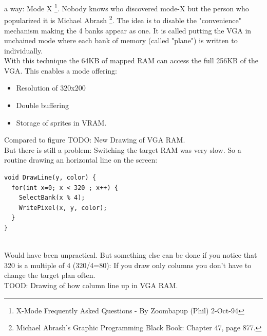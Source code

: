 a way: Mode X \footnote{X-Mode Frequently Asked Questions - By Zoombapup (Phil)  2-Oct-94}. Nobody knows who discovered mode-X but the person who popularized it is Michael Abrash \footnote{Michael Abrash's Graphic Programming Black Book: Chapter 47, page 877.}. The idea is to disable the "convenience" mechanism making the 4 banks appear as one. It is called putting the VGA in unchained mode where each bank of memory (called "plane") is written to individually.\\
With this technique the 64KB of mapped RAM can access the full 256KB of the VGA. This enables a mode offering:
\begin{itemize}
	\item Resolution of 320x200
	\item Double buffering
	\item Storage of sprites in VRAM.
\end{itemize}

Compared to figure 
TODO: New Drawing of VGA RAM.\\
But there is still a problem: Switching the target RAM was very slow. So a routine drawing an horizontal line on the screen:

\begin{verbatim}
void DrawLine(y, color) {
  for(int x=0; x < 320 ; x++) {
    SelectBank(x % 4);
    WritePixel(x, y, color);   
  }
}
\end{verbatim}\\
Would have been unpractical. But something else can be done if you notice that 320 is a multiple of 4 (320/4=80): If you draw only columns you don't have to change the target plan often.\\
TOOD: Drawing of how column line up in VGA RAM.\\





